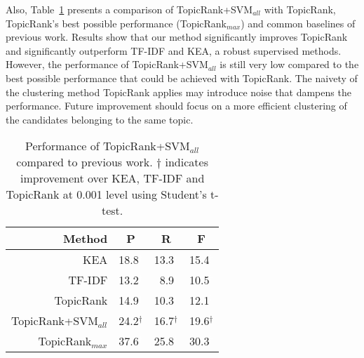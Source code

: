   Also, Table~\ref{tab:state_of_the_art_comparison} presents a comparison of
  TopicRank+SVM$_{all}$ with TopicRank, TopicRank's best possible performance
  (TopicRank$_{max}$) and common baselines of previous work. Results show that
  our method significantly improves TopicRank and significantly outperform
  TF-IDF and KEA, a robust supervised methods. However, the performance of
  TopicRank+SVM$_{all}$ is still very low compared to the best possible
  performance that could be achieved with TopicRank. The naivety of the
  clustering method TopicRank applies may introduce noise that dampens the
  performance. Future improvement should focus on a more efficient clustering of
  the candidates belonging to the same topic.
  \begin{table}[h]
    \centering
    \begin{tabular}{|r|rrr|}
      \hline
      Method & \multicolumn{1}{c}{P} & \multicolumn{1}{c}{R} & \multicolumn{1}{c|}{F}\\
      \hline
      KEA                   & 18.8\textcolor{white}{$^\dagger$} & 13.3\textcolor{white}{$^\dagger$} & 15.4\textcolor{white}{$^\dagger$}\\
      TF-IDF                & 13.2\textcolor{white}{$^\dagger$} & 8.9\textcolor{white}{$^\dagger$} & 10.5\textcolor{white}{$^\dagger$}\\
      TopicRank             & 14.9\textcolor{white}{$^\dagger$} & 10.3\textcolor{white}{$^\dagger$} & 12.1\textcolor{white}{$^\dagger$}\\
      TopicRank+SVM$_{all}$ & 24.2$^\dagger$ & 16.7$^\dagger$ & 19.6$^\dagger$\\
      \hline
      TopicRank$_{max}$     & 37.6\textcolor{white}{$^\dagger$} & 25.8\textcolor{white}{$^\dagger$} & 30.3\textcolor{white}{$^\dagger$}\\
      \hline
    \end{tabular}
    \caption{Performance of TopicRank+SVM$_{all}$ compared to previous work.
      $\dagger$ indicates improvement over KEA, TF-IDF and TopicRank at 0.001
      level using Student's t-test.
             \label{tab:state_of_the_art_comparison}}
  \end{table}


